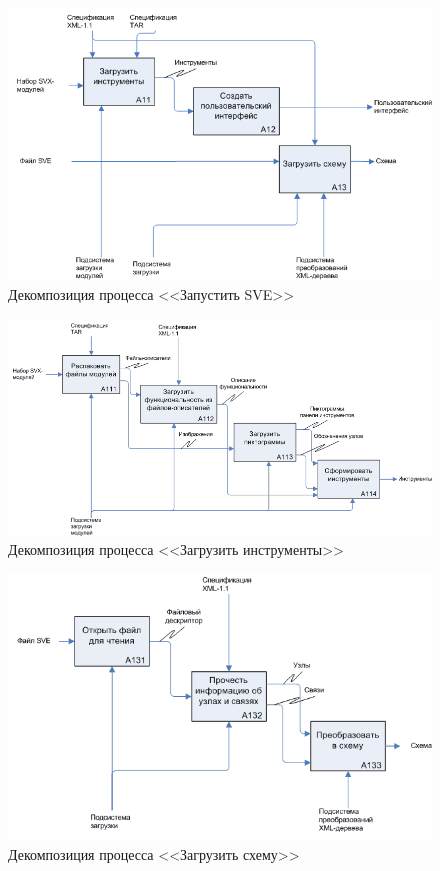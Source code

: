 \begin{figure}[H]
  \centering
  \includegraphics[width=1.0\textwidth]{diagrams/idef/a1-b.png}
  \caption{Декомпозиция процесса <<Запустить SVE>>}
\end{figure}

\begin{figure}[H]
  \centering
  \includegraphics[width=1.0\textwidth]{diagrams/idef/a11-b.png}
  \caption{Декомпозиция процесса <<Загрузить инструменты>>}
  \label{fig:load-plugins}
\end{figure}

\begin{figure}[H]
  \centering
  \includegraphics[width=1.0\textwidth]{diagrams/idef/a13-b.png}
  \caption{Декомпозиция процесса <<Загрузить схему>>}
  \label{fig:load-scheme}
\end{figure}

